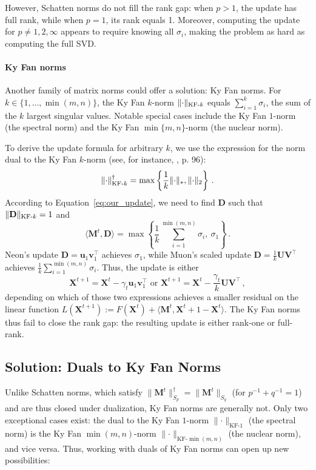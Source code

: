 \documentclass[a4paper,14pt,oneside]{extarticle}
\newcommand{\norm}[1]{\lVert #1\rVert}
\DeclarePairedDelimiter{\norms}{\|}{\|_{\mathrm{2}}}
\DeclarePairedDelimiter{\normn}{\|}{\|_{*}}
\DeclarePairedDelimiter{\normkfk}{\|}{\|_{\text{KF-}k}}
\def\<#1,#2>{\langle #1,#2\rangle}
\newcommand{\vu}{\mathbf{u}}
\newcommand{\vv}{\mathbf{v}}
\newcommand{\mX}{\mathbf{X}}
\newcommand{\mM}{\mathbf{M}}
\newcommand{\mD}{\mathbf{D}}
\newcommand{\mU}{\mathbf{U}}
\newcommand{\mV}{\mathbf{V}}
\newcommand{\equationref}[1]{Equation~\ref{#1}}
\begin{document}
However, Schatten norms do not fill the rank gap: when $p > 1$, the update has full rank, while when $p=1$, its rank equals 1. Moreover, computing the update for $p \neq 1, 2, \infty$ appears to require knowing all $\sigma_i$, making the problem as hard as computing the full SVD.

\paragraph{Ky Fan norms}
Another family of matrix norms could offer a solution: Ky Fan norms. For $k \in \{1, \dots, \min(m, n)\}$, the Ky Fan $k$-norm $\normkfk{\cdot}$ equals $\sum_{i=1}^{k}\sigma_i$, the sum of the $k$ largest singular values. Notable special cases include the Ky Fan $1$-norm (the spectral norm) and the Ky Fan $\min\{m, n\}$-norm (the nuclear norm).

To derive the update formula for arbitrary $k$, we use the expression for the norm dual to the Ky Fan $k$-norm (see, for instance, \citep{bhatia2013matrix}, p. 96):
\[
    \normkfk{\cdot}^\dagger = \max\left\{\frac{1}{k} \normn{\cdot}, \norms{\cdot}\right\}\,.
\]
According to \equationref{eq:our_update}, we need to find $\mD$ such that $\normkfk{\mD} = 1$ and
\[
\<\mM^t, \mD> = \max\left\{\frac{1}{k}\sum_{i=1}^{\min(m,n)}\sigma_i,\ \sigma_1\right\}\,.
\]
Neon's update $\mD = \vu_1 \vv_1^\top$ achieves $\sigma_1$, while Muon's scaled update $\mD = \frac{1}{k}\mU\mV^\top$ achieves $\frac{1}{k}\sum_{i=1}^{\min(m,n)}\sigma_i$. Thus, the update is either
\[
\mX^{t+1} = \mX^{t} - \gamma_t \vu_1 \vv_1^\top\text{ or }\mX^{t+1} = \mX^{t} - \frac{\gamma_t}{k}\mU \mV^\top\,,
\]
depending on which of those two expressions achieves a smaller residual on the linear function $L(\mX^{t+1}) := F(\mX^t) + \<\mM^t, \mX^{t+1} - \mX^t>$. The Ky Fan norms thus fail to close the rank gap: the resulting update is either rank-one or full-rank.

\subsection{Solution: Duals to Ky Fan Norms}

Unlike Schatten norms, which satisfy $\norm{\mM^t}_{S_p}^\dagger = \norm{\mM^t}_{S_q}$ (for $p^{-1} + q^{-1} = 1$) and are thus closed under dualization, Ky Fan norms are generally not. Only two exceptional cases exist: the dual to the Ky Fan $1$-norm $\norm{\cdot}_{\text{KF-}1}$ (the spectral norm) is the Ky Fan $\min(m,n)$-norm $\norm{\cdot}_{\text{KF-}\min(m,n)}$ (the nuclear norm), and vice versa. Thus, working with duals of Ky Fan norms can open up new possibilities:
\end{document}
